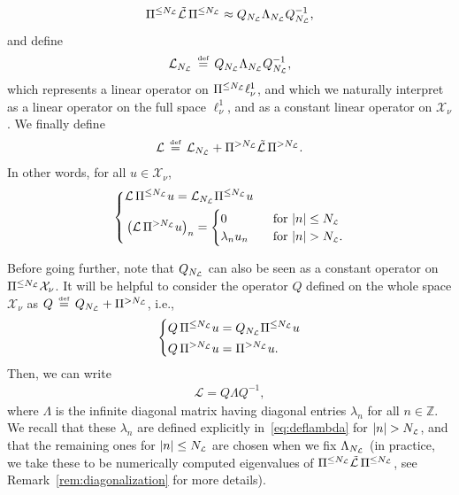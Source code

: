 \documentclass[10pt,a4paper]{article}
\theoremstyle{plain}
\newcommand{\ZZ}{\mathbb Z}
\renewcommand{\L}{\mathcal{L}}
\newcommand{\tL}{\tilde{\mathcal{L}}}
\newcommand{\X}{\mathcal{X}}
\newcommand{\1}{\mathbf{1}}
\newcommand{\bydef}{\,\stackrel{\mbox{\tiny\textnormal{\raisebox{0ex}[0ex][0ex]{def}}}}{=}\,}
\newcommand{\NL}{N_{\text{\tiny{$\L$}}}}
\begin{document}
\begin{equation*}
\Pi^{\leq \NL} \tilde{\L} \, \Pi^{\leq \NL} \approx Q_{\NL} \Lambda_{\NL} Q_{\NL}^{-1},
\end{equation*}
and define
\begin{equation*}
\L_{\NL} \bydef Q_{\NL} \Lambda_{\NL} Q_{\NL}^{-1},
\end{equation*}
which represents a linear operator on $\Pi^{\leq \NL}\ell^1_\nu$, and which we naturally interpret as a linear operator on the full space $\ell^1_\nu$, and as a constant linear operator on $\X_\nu$.  We finally define 
\begin{align*}
\L \bydef \L_{\NL} + \Pi^{> \NL} \tL \,\Pi^{> \NL}.
\end{align*}
In other words, for all $u\in\X_\nu$,
\begin{equation*}
\left\{
\begin{aligned}
& \L  \,\Pi^{\leq \NL}u =  \L_{\NL}\Pi^{\leq \NL} u \\
&\left(\L \,\Pi^{> \NL}u\right)_n =  
\begin{cases}
	0 & \quad \text{for } \vert n\vert \leq \NL\\
	\lambda_n u_n &\quad \text{for } \vert n\vert > \NL.
\end{cases}
\end{aligned}
\right.
\end{equation*}


Before going further, note that $Q_{\NL}$ can also be seen as a constant operator on $\Pi^{\leq \NL}\X_\nu$. It will be helpful to consider the operator $Q$ defined on the whole space $\X_\nu$ as $Q \bydef Q_{\NL} + \Pi^{>\NL}$, i.e.,
\begin{equation*}
\left\{
\begin{aligned}
&Q \,\Pi^{\leq \NL} u =  Q_{\NL}\Pi^{\leq \NL} u \\
&Q \,\Pi^{>\NL} u = \Pi^{>\NL} u.
\end{aligned}
\right.
\end{equation*}
Then, we can write
\begin{align*}
\L = Q\Lambda Q^{-1},
\end{align*}
where $\Lambda$ is the infinite diagonal matrix having diagonal entries $\lambda_n$ for all $n\in\ZZ$. We recall that these $\lambda_n$ are defined explicitly in~\eqref{eq:deflambda} for $\vert n\vert> \NL$, and that the remaining ones for $\vert n\vert \leq  \NL$ are chosen when we fix $\Lambda_{\NL}$ (in practice, we take these to be numerically computed eigenvalues of $\Pi^{\leq \NL} \tL \,\Pi^{\leq \NL}$, see Remark~\ref{rem:diagonalization} for more details).
\end{document}
